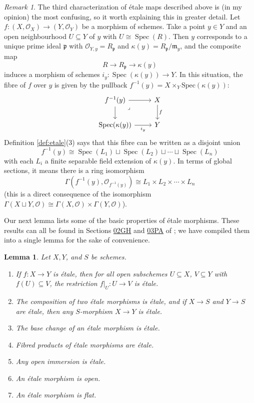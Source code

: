 \documentclass{article}
\def\~#1{\mathscr{#1}}
\numberwithin{equation}{section}
\numberwithin{figure}{section}
\newcommand{\Spec}{\mathop{\mathrm{Spec}}}
\renewcommand{\frak}[1]{\mathfrak{#1}}
\theoremstyle{plain}
\newtheorem{lem}[thm]{Lemma}
\theoremstyle{definition}
\theoremstyle{remark}
\newtheorem*{rmk}{Remark}
\begin{document}
\begin{rmk}
    The third characterization of \'etale maps described above is (in my opinion) the most confusing, so it worth explaining this in greater detail. Let $f: (X, \~O_X) \to (Y, \~O_Y)$ be a morphism of schemes. Take a point $y \in Y$ and an open neighbourhood $U \subseteq Y$ of $y$ with $U \cong \Spec(R)$. Then $y$ corresponds to a unique prime ideal $\frak{p}$ with $\~O_{Y,y} = R_{\frak{p}}$ and $\kappa(y) = R_{\frak{p}}/\frak{m}_y$, and the composite map 
    \[R \to R_{\frak{p}} \to \kappa(y)\]
    induces a morphism of schemes $i_y: \Spec(\kappa(y)) \to Y$. In this situation, the fibre of $f$ over $y$ is given by the pullback $f^{-1}(y) = X \times_Y \text{Spec}(\kappa(y))$:
\[\begin{tikzcd}
    {f^{-1}(y)} & X \\
    {\Spec(\kappa(y))} & Y
    \arrow[from=1-1, to=1-2]
    \arrow[from=1-1, to=2-1]
    \arrow["\lrcorner"{anchor=center, pos=0.125}, draw=none, from=1-1, to=2-2]
    \arrow["f", from=1-2, to=2-2]
    \arrow["{{i_y}}"', from=2-1, to=2-2]
\end{tikzcd}\]
Definition \ref{def:etale}(3) says that this fibre can be written as a disjoint union
\[f^{-1}(y) \cong \Spec(L_1) \sqcup \Spec(L_2) \sqcup \cdots \sqcup \Spec(L_n)\]
with each $L_i$ a finite separable field extension of $\kappa(y)$. In terms of global sections, it means there is a ring isomorphism
\[\Gamma \left(f^{-1}(y), \~O_{f^{-1}(y)} \right) \cong L_1 \times L_2 \times \cdots \times L_n\]
(this is a direct consequence of the isomorphism $\Gamma(X \sqcup Y, \~{O}) \cong \Gamma(X, \~{O}) \times \Gamma(Y, \~{O})$).
\end{rmk}

Our next lemma lists some of the basic properties of \'etale morphisms. These results can all be found in Sections \href{https://stacks.math.columbia.edu/tag/02GH}{02GH} and \href{https://stacks.math.columbia.edu/tag/03PA}{03PA} of \cite{stacks}; we have compiled them into a single lemma for the sake of convenience.
\begin{lem}\label{lem:etale_properties}
Let $X, Y$, and $S$ be schemes. 
\begin{enumerate}
     \item If $f: X \to Y$ is \'etale, then for all open subschemes $U \subseteq X$, $V \subseteq Y$ with $f(U) \subseteq V$, the restriction $f|_U: U \to V$ is \'etale.
     \item The composition of two \'etale morphisms is \'etale, and if $X \to S$ and $Y \to S$ are \'etale, then any $S$-morphism $X \to Y$ is \'etale.
     \item The base change of an \'etale morphism is \'etale.
     \item Fibred products of \'etale morphisms are \'etale.
     \item Any open immersion is \'etale.
     \item An \'etale morphism is open.
     \item An \'etale morphism is flat.
\end{enumerate}
\end{lem}
\end{document}
